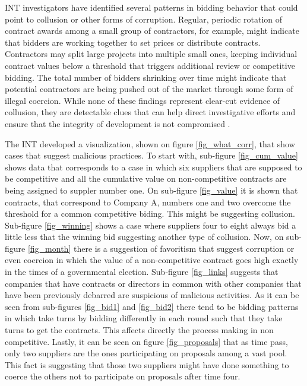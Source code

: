 INT investigators have identified several patterns in bidding behavior that could point to collusion or other forms of corruption. Regular, periodic rotation of contract awards among a small group of contractors, for example, might indicate that bidders are working together to set prices or distribute contracts. Contractors may split large projects into multiple small ones, keeping individual contract values below a threshold that triggers additional review or competitive bidding. The total number of bidders shrinking over time might indicate that potential contractors are being pushed out of the market through some form of illegal coercion. While none of these findings represent clear-cut evidence of collusion, they are detectable clues that can help direct investigative efforts and ensure that the integrity of development is not compromised \parencite{dssg_proc}.

The INT developed a visualization, shown on figure \ref{fig_what_corr}, that show cases that suggest malicious practices. To start with, sub-figure \ref{fig_cum_value} shows data that corresponds to a case in which  six suppliers that are supposed to be competitive and all the cumulative value on non-competitive contracts are being assigned to suppler number one. On sub-figure \ref{fig_value} it is shown that contracts, that correspond to Company A, numbers one and two overcome the threshold for a common competitive biding. This might be suggesting collusion. Sub-figure \ref{fig_winning} shows a case where suppliers four to eight always bid a little less that the winning bid suggesting another type of collusion. Now, on sub-figure \ref{fig_month} there is a suggestion of favoritism that suggest corruption or even coercion in which the value of a non-competitive contract goes high exactly in the times of a governmental election. Sub-figure \ref{fig_links} suggests that companies that have contracts or directors in common with other companies that have been previously debarred are suspicious of malicious activities. As it can be seen from sub-figures 
\ref{fig_bid1} and \ref{fig_bid2} there tend to be bidding patterns in which take turns by bidding differently in each round such that they take turns to get the contracts. This affects directly the process making in non competitive. Lastly, it can be seen on figure \ref{fig_proposals} that as time pass, only two suppliers are the ones participating on proposals among a vast pool. This  fact is suggesting that those two suppliers might have done something  to coerce the others not to participate on proposals after time four.

